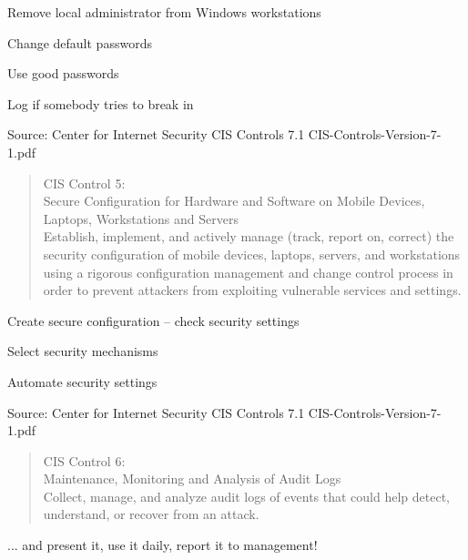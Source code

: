 \documentclass[Screen16to9,17pt]{foils}
\begin{document}
\begin{list1}
\item Remove local administrator from Windows workstations
\item Change default passwords
\item Use good passwords
\item Log if somebody tries to break in
\end{list1}

Source: Center for Internet Security CIS Controls 7.1 CIS-Controls-Version-7-1.pdf



\begin{quote}
CIS Control 5:\\
Secure Configuration for Hardware and Software on Mobile Devices, Laptops, Workstations and Servers\\
Establish, implement, and actively manage (track, report on, correct) the security configuration of mobile devices, laptops, servers, and workstations using a rigorous configuration management and change control process in order to prevent attackers from exploiting vulnerable services and settings.
\end{quote}

\begin{list1}
\item Create secure configuration -- check security settings
\item Select security mechanisms
\item Automate security settings
\end{list1}

Source: Center for Internet Security CIS Controls 7.1 CIS-Controls-Version-7-1.pdf



\begin{quote}
CIS Control 6:\\
Maintenance, Monitoring and Analysis of Audit Logs\\
Collect, manage, and analyze audit logs of events that could help detect, understand, or recover from an attack.
\end{quote}

\begin{list1}
\item ... and present it, use it daily, report it to management!
\item
\item
\item
\end{list1}
\end{document}
